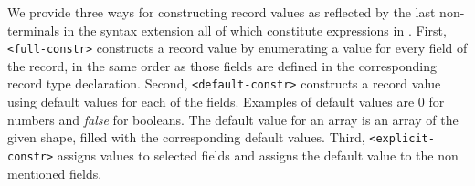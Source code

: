 We provide three ways for constructing record values as reflected by the last non-terminals in the syntax extension
all of which constitute expressions in \sac{}.
First, \verb|<full-constr>| constructs a record value by enumerating a value for every field of the record, in the same order as those fields are defined in the corresponding record type declaration.
Second, \verb|<default-constr>| constructs a record value using default values for each of the fields. 
Examples of default values are $0$ for numbers and \textit{false} for booleans. 
The default value for an array is an array of the given shape, filled with the corresponding default values.
Third, \verb|<explicit-constr>| assigns values to selected fields and assigns the default value to the non mentioned fields. 
